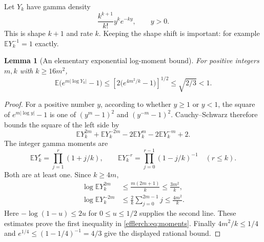 \documentclass[11pt,letterpaper]{article}
\newtheorem{lemma}[theorem]{Lemma}
\theoremstyle{definition}
\theoremstyle{remark}
\begin{document}
Let $Y_k$ have gamma density
\[
 \frac{k^{k+1}}{k!}y^k e^{-ky},\qquad y>0.
\]
This is shape $k+1$ and rate $k$.  Keeping the shape shift is important:
for example $\mathbb E Y_k^{-1}=1$ exactly.

\begin{lemma}[An elementary exponential log-moment bound]
\label{efflerch:lem:moments}
For positive integers $m,k$ with $k\geq16m^2$,
\begin{equation}\label{efflerch:eq:moments}
 \mathbb E\bigl(e^{m|\log Y_k|}-1\bigr)
 \leq\left[2\bigl(e^{4m^2/k}-1\bigr)\right]^{1/2}
 \leq\sqrt{2/3}<1.
\end{equation}
\end{lemma}
\begin{proof}
For a positive number $y$, according to whether $y\geq1$ or $y<1$,
the square of $e^{m|\log y|}-1$ is one of
$(y^m-1)^2$ and $(y^{-m}-1)^2$.  Cauchy--Schwarz therefore bounds
the square of the left side by
\[
 \mathbb E Y_k^{2m}+\mathbb E Y_k^{-2m}
  -2\mathbb E Y_k^m-2\mathbb E Y_k^{-m}+2.
\]
The integer gamma moments are
\[
 \mathbb E Y_k^r=\prod_{j=1}^r(1+j/k),\qquad
 \mathbb E Y_k^{-r}=\prod_{j=0}^{r-1}(1-j/k)^{-1}\quad(r\leq k).
\]
Both are at least one.  Since $k\geq4m$,
\begin{align*}
 \log\mathbb E Y_k^{2m}
  &\leq\frac{m(2m+1)}k\leq\frac{3m^2}k,\\
 \log\mathbb E Y_k^{-2m}
  &\leq\frac2k\sum_{j=0}^{2m-1}j
   \leq\frac{4m^2}k.
\end{align*}
Here $-\log(1-u)\leq2u$ for $0\leq u\leq1/2$ supplies the second
line.  These estimates prove the first inequality in
\eqref{efflerch:eq:moments}.  Finally $4m^2/k\leq1/4$ and
$e^{1/4}\leq(1-1/4)^{-1}=4/3$ give the displayed rational bound.
\end{proof}
\end{document}
